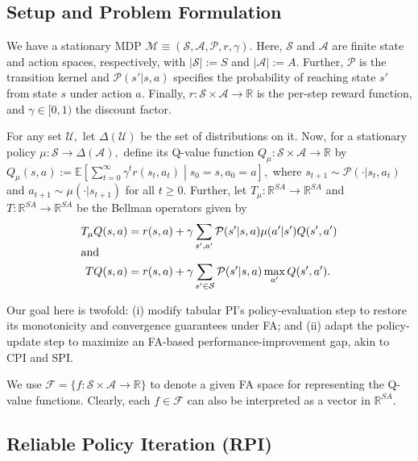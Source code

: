\documentclass[twoside]{article}
\theoremstyle{plain}
\theoremstyle{definition}
\theoremstyle{remark}
\newcommand{\bE}{\mathbb{E}}
\newcommand{\bR}{\mathbb{R}}
\newcommand{\cA}{\mathcal{A}}
\newcommand{\cM}{\mathcal{M}}
\newcommand{\cP}{\mathcal{P}}
\newcommand{\cS}{\mathcal{S}}
\newcommand{\cU}{\mathcal{U}}
\newcommand{\cF}{\mathcal{F}}
\begin{document}
\subsection{Setup and Problem Formulation}
\label{subsec:setup_and_problem}
%
We have a stationary MDP $\cM \equiv (\cS, \cA, \cP, r, \gamma).$ Here, $\cS$ and $\cA$ are finite state and action spaces, respectively, with $|\cS| := S$ and $|\cA| := A.$ Further, $\cP$ is the transition kernel and $\cP(s'|s, a)$ specifies the probability of reaching state $s'$ from state $s$ under action $a.$ Finally, $r: \cS \times \cA \to \bR$ is the per-step reward function, and $\gamma \in [0, 1)$ the discount factor. 

For any set $\cU,$ let $\Delta(\cU)$ be the set of distributions on it. Now, for a stationary policy $\mu: \cS \to \Delta(\cA),$ define its Q-value function $Q_\mu : \cS \times \cA \to \bR$ by $Q_\mu(s, a) := \bE \left[\sum_{t = 0}^\infty \gamma^t r(s_t, a_t) \middle|s_0 = s, a_0 = a \right],$ where $s_{t + 1} \sim \cP(\cdot|s_t, a_t)$ and $a_{t + 1} \sim \mu(\cdot|s_{t + 1})$ for all $t \geq 0.$ Further, let $T_\mu: \bR^{SA} \to \bR^{SA}$ and $T: \bR^{SA} \to \bR^{SA}$ be the Bellman operators given by
%
\begin{align*}
    T_\mu Q (s, a) = {} & r(s, a) + \gamma \sum_{s', a'} \cP(s'|s, a) \mu(a'|s') Q(s', a') \\[-2ex]
    \intertext{and}
    T Q(s, a) = {} & r(s, a) + \gamma \sum_{s' \in \cS} \cP(s'|s, a) \max_{a'} Q(s', a').
\end{align*}
    
Our goal here is twofold: (i) modify tabular PI’s policy-evaluation step to restore its monotonicity and convergence guarantees under FA; and (ii) adapt the policy-update step to maximize an FA-based performance-improvement gap, akin to CPI and SPI. 



We use $\cF = \{f: \cS \times \cA \to \bR\}$ to denote a given FA space for representing the Q-value functions. Clearly, each $f \in \cF$ can also be interpreted as a vector in $\bR^{SA}.$ 

\subsection{Reliable Policy Iteration (RPI)}
%
\label{subsec:RPI}
\end{document}
